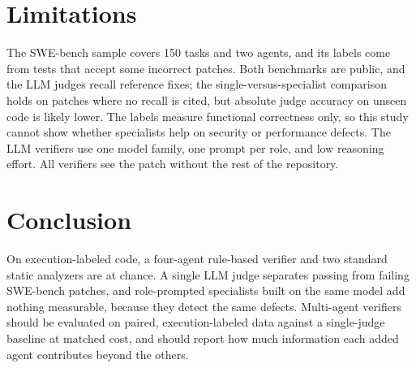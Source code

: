 \section{Limitations}

The SWE-bench sample covers 150 tasks and two agents, and its labels come from tests that accept some incorrect patches. Both benchmarks are public, and the LLM judges recall reference fixes; the single-versus-specialist comparison holds on patches where no recall is cited, but absolute judge accuracy on unseen code is likely lower. The labels measure functional correctness only, so this study cannot show whether specialists help on security or performance defects. The LLM verifiers use one model family, one prompt per role, and low reasoning effort. All verifiers see the patch without the rest of the repository.

\section{Conclusion}

On execution-labeled code, a four-agent rule-based verifier and two standard static analyzers are at chance. A single LLM judge separates passing from failing SWE-bench patches, and role-prompted specialists built on the same model add nothing measurable, because they detect the same defects. Multi-agent verifiers should be evaluated on paired, execution-labeled data against a single-judge baseline at matched cost, and should report how much information each added agent contributes beyond the others.
